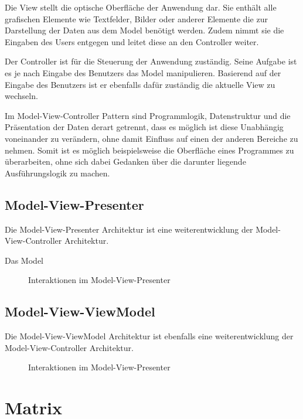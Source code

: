     Die View stellt die optische Oberfläche der Anwendung dar.
    Sie enthält alle grafischen Elemente wie Textfelder, Bilder oder anderer Elemente die zur Darstellung der Daten aus dem Model benötigt werden.
    Zudem nimmt sie die Eingaben des Users entgegen und leitet diese an den Controller weiter.


    Der Controller ist für die Steuerung der Anwendung zuständig.
    Seine Aufgabe ist es je nach Eingabe des Benutzers das Model manipulieren.
    Basierend auf der Eingabe des Benutzers ist er ebenfalls dafür zuständig die aktuelle View zu wechseln.


    Im Model-View-Controller Pattern sind Programmlogik, Datenstruktur und die Präsentation der Daten derart getrennt, dass es möglich ist diese Unabhängig voneinander zu verändern, ohne damit Einfluss auf einen der anderen Bereiche zu nehmen.
    Somit ist es möglich beispielsweise die Oberfläche eines Programmes zu überarbeiten, ohne sich dabei Gedanken über die darunter liegende Ausführungslogik zu machen.


    \newpage
    \subsection{Model-View-Presenter}\label{subsec:model-view-presenter}
    Die Model-View-Presenter Architektur ist eine weiterentwicklung der Model-View-Controller Architektur.

    Das Model

    \begin{figure}
        \centering
        
        \caption{Interaktionen im Model-View-Presenter}
        \label{fig:mvp}
    \end{figure}

    \subsection{Model-View-ViewModel}\label{subsec:model-view-viewmodel}
    Die Model-View-ViewModel Architektur ist ebenfalls eine weiterentwicklung der Model-View-Controller Architektur.


    \begin{figure}
        \centering
        
        \caption{Interaktionen im Model-View-Presenter}
        \label{fig:mvvm}
    \end{figure}

    \newpage
    \section{Matrix}\label{sec:matrix}

